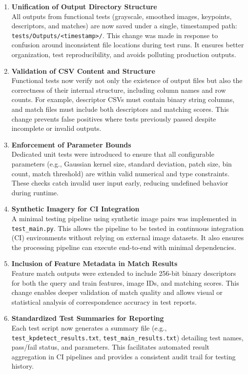 \documentclass[12pt, titlepage]{article}
\begin{document}
\begin{enumerate}
  \item \textbf{Unification of Output Directory Structure} \\
  All outputs from functional tests (grayscale, smoothed images, keypoints, descriptors, and matches) are now saved under a single, timestamped path: \texttt{tests/Outputs/<timestamp>/}. This change was made in response to confusion around inconsistent file locations during test runs. It ensures better organization, test reproducibility, and avoids polluting production outputs.

  \item \textbf{Validation of CSV Content and Structure} \\
  Functional tests now verify not only the existence of output files but also the correctness of their internal structure, including column names and row counts. For example, descriptor CSVs must contain binary string columns, and match files must include both descriptors and matching scores. This change prevents false positives where tests previously passed despite incomplete or invalid outputs.

  \item \textbf{Enforcement of Parameter Bounds} \\
  Dedicated unit tests were introduced to ensure that all configurable parameters (e.g., Gaussian kernel size, standard deviation, patch size, bin count, match threshold) are within valid numerical and type constraints. These checks catch invalid user input early, reducing undefined behavior during runtime.

  \item \textbf{Synthetic Imagery for CI Integration} \\
  A minimal testing pipeline using synthetic image pairs was implemented in \texttt{test\_main.py}. This allows the pipeline to be tested in continuous integration (CI) environments without relying on external image datasets. It also ensures the processing pipeline can execute end-to-end with minimal dependencies.

  \item \textbf{Inclusion of Feature Metadata in Match Results} \\
  Feature match outputs were extended to include 256-bit binary descriptors for both the query and train features, image IDs, and matching scores. This change enables deeper validation of match quality and allows visual or statistical analysis of correspondence accuracy in test reports.

  \item \textbf{Standardized Test Summaries for Reporting} \\
  Each test script now generates a summary file (e.g., \texttt{test\_kpdetect\_results.txt}, \texttt{test\_main\_results.txt}) detailing test names, pass/fail status, and parameters. This facilitates automated result aggregation in CI pipelines and provides a consistent audit trail for testing history.
\end{enumerate}
\end{document}
